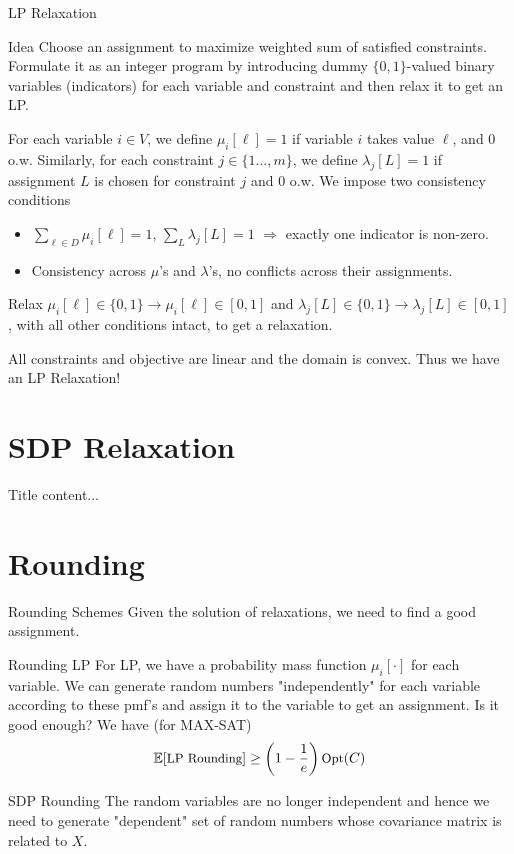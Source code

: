 \documentclass[10pt,t,compress]{beamer}
\begin{document}
\begin{frame}{LP Relaxation}
\begin{block}{Idea}
Choose an assignment to maximize weighted sum of satisfied constraints. Formulate it as an integer program by introducing dummy $\{ 0, 1\}$-valued binary variables (indicators) for each variable and constraint and then relax it to get an LP.
\end{block}
 For each variable $i \in V$, we define $\mu_i[\ell] =1$ if variable $i$ takes value $\ell$, and $0$ o.w. Similarly, for each constraint $j \in \{1\ldots, m\}$, we define $\lambda_j[L] = 1$ if assignment $L$ is chosen for constraint $j$ and $0$ o.w. We impose two consistency conditions 
 \begin{itemize}
 \item $\sum_{\ell \in D} \mu_i[\ell] = 1$, $\sum_{L} \lambda_j[L] = 1$ $\Rightarrow$ exactly one indicator is non-zero.
 \item Consistency across $\mu$'s and $\lambda$'s, no conflicts across their assignments.
 \end{itemize}
 Relax $\mu_i[\ell] \in \{ 0, 1\} \rightarrow \mu_i[\ell] \in [0, 1]$ and $\lambda_j[L] \in \{ 0, 1\} \rightarrow \lambda_j[L] \in [0, 1]$, with all other conditions intact, to get a relaxation. 
 
 All constraints and objective are linear and the domain is convex. Thus we have an LP Relaxation!
 
\end{frame}

\section{SDP Relaxation}

\begin{frame}{Title}
	content...
\end{frame}

\section{Rounding}
\begin{frame}{Rounding Schemes}
Given the solution of relaxations, we need to find a good assignment.
\begin{block}{Rounding LP}
For LP, we have a probability mass function $\mu_i[\cdot]$ for each variable. We can generate random numbers "independently" for each variable according to these pmf's and assign it to the variable to get an assignment. Is it good enough? We have (for MAX-SAT)
\[\small \mathbb{E}[\mbox{LP Rounding}] \geq \left(1-\frac{1}{e} \right) \mbox{Opt}(C) \]
\end{block}

\begin{block}{SDP Rounding}
The random variables are no longer independent and hence we need to generate "dependent" set of random numbers whose covariance matrix is related to $X$.
\end{block}
\end{frame}
\end{document}
